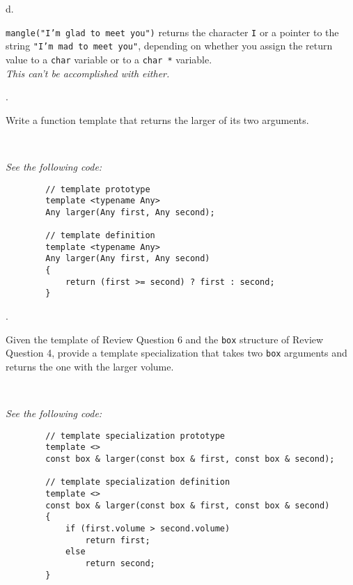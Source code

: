 \documentclass{amsart}
\begin{document}
\phantom{1. }d.
\begin{minipage}[t]{11.5 cm}
	\texttt{mangle("I'm glad to meet you")} returns the character \texttt{I} or a pointer to the string \texttt{"I'm mad to meet you"}, depending on whether you assign the return value to a \texttt{char} variable or to a \texttt{char *} variable. \\[1ex]
	{\slshape This can't be accomplished with either.} \\
	{} %
\end{minipage}
\vfill
\newpage

\phantom{\quad} \vfill
{}. 
\begin{minipage}[t]{11.5 cm}
	Write a function template that returns the larger of its two arguments.
\end{minipage} \\[1ex]
\phantom{3. } 
\begin{minipage}[t]{11.5 cm}
	{\slshape See the following code:}
	\begin{verbatim}
		// template prototype
		template <typename Any>
		Any larger(Any first, Any second);

		// template definition
		template <typename Any>
		Any larger(Any first, Any second)
		{
		    return (first >= second) ? first : second;
		}
	\end{verbatim}
\end{minipage} 
\vfill

. 
\begin{minipage}[t]{11.5 cm}
	Given the template of Review Question 6 and the \texttt{box} structure of Review Question 4, provide a template specialization that takes two \texttt{box} arguments and returns the one with the larger volume. 
\end{minipage} \\[1ex]
\phantom{2. } 
\begin{minipage}[t]{11.5 cm}
	{\slshape See the following code:}
	\begin{verbatim}
		// template specialization prototype
		template <> 
		const box & larger(const box & first, const box & second);

		// template specialization definition
		template <> 
		const box & larger(const box & first, const box & second)
		{
		    if (first.volume > second.volume)
		        return first;
		    else 
		        return second;
		}
	\end{verbatim} 
\end{minipage} 
\vfill
\end{document}
